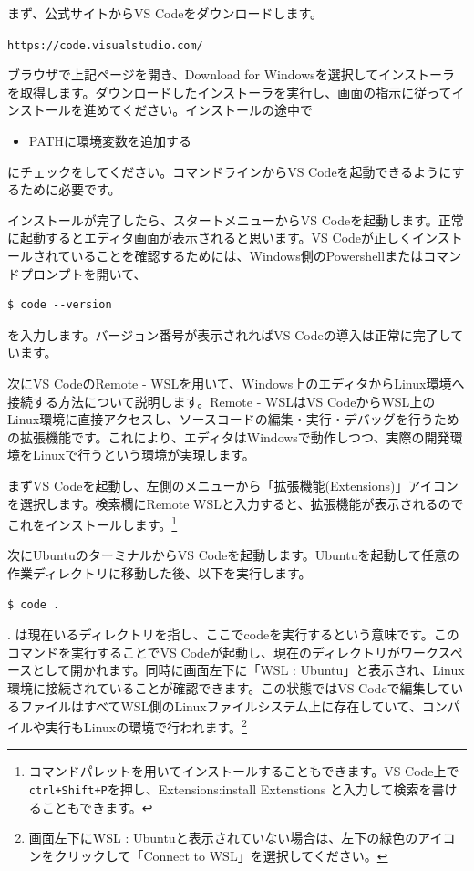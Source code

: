 \documentclass[12pt]{jreport}
\newcommand{\myurl}[1]{%
\begin{tcolorbox}[
  colback=gray!10,
  colframe=sectionblue,
  boxrule=0.5pt,
  arc=4pt,
  left=6pt,
  right=6pt,
  top=4pt,
  bottom=4pt]
\texttt{#1}
\end{tcolorbox}
}
\begin{document}
まず、公式サイトからVS Codeをダウンロードします。

\myurl{https://code.visualstudio.com/}

ブラウザで上記ページを開き、Download for Windowsを選択してインストーラを取得します。ダウンロードしたインストーラを実行し、画面の指示に従ってインストールを進めてください。インストールの途中で
\begin{itemize}
  \item PATHに環境変数を追加する
\end{itemize}
にチェックをしてください。コマンドラインからVS Codeを起動できるようにするために必要です。

インストールが完了したら、スタートメニューからVS Codeを起動します。正常に起動するとエディタ画面が表示されると思います。VS Codeが正しくインストールされていることを確認するためには、Windows側のPowershellまたはコマンドプロンプトを開いて、
\begin{lstlisting}[style=terminal]
  $ code --version
\end{lstlisting}
を入力します。バージョン番号が表示されればVS Codeの導入は正常に完了しています。

次にVS CodeのRemote - WSLを用いて、Windows上のエディタからLinux環境へ接続する方法について説明します。Remote - WSLはVS CodeからWSL上のLinux環境に直接アクセスし、ソースコードの編集・実行・デバッグを行うための拡張機能です。これにより、エディタはWindowsで動作しつつ、実際の開発環境をLinuxで行うという環境が実現します。

まずVS Codeを起動し、左側のメニューから「拡張機能(Extensions)」アイコンを選択します。検索欄にRemote WSLと入力すると、拡張機能が表示されるのでこれをインストールします。\footnote{コマンドパレットを用いてインストールすることもできます。VS Code上で\texttt{ctrl+Shift+P}を押し、Extensions:install Extenstions と入力して検索を書けることもできます。}

次にUbuntuのターミナルからVS Codeを起動します。Ubuntuを起動して任意の作業ディレクトリに移動した後、以下を実行します。

\begin{lstlisting}[style=terminal]
  $ code .
\end{lstlisting}
. は現在いるディレクトリを指し、ここでcodeを実行するという意味です。このコマンドを実行することでVS Codeが起動し、現在のディレクトリがワークスペースとして開かれます。同時に画面左下に「WSL : Ubuntu」と表示され、Linux環境に接続されていることが確認できます。この状態ではVS Codeで編集しているファイルはすべてWSL側のLinuxファイルシステム上に存在していて、コンパイルや実行もLinuxの環境で行われます。\footnote{画面左下にWSL : Ubuntuと表示されていない場合は、左下の緑色のアイコンをクリックして「Connect to WSL」を選択してください。}
\end{document}
